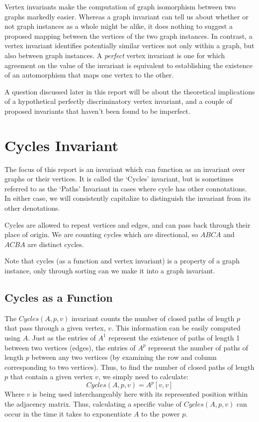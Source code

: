 \documentclass[11pt,a4paper]{report}
\begin{document}
Vertex invariants make the computation of graph isomorphism between two graphs markedly easier. 
Whereas a graph invariant can tell us about whether or not graph instances as a whole might be alike, it does nothing to suggest a proposed mapping between the vertices of the two graph instances.
In contrast, a vertex invariant identifies potentially similar vertices not only within a graph, but also between graph instances.
A \emph{perfect} vertex invariant is one for which agreement on the value of the invariant is equivalent to establishing the existence of an automorphism that maps one vertex to the other.

A question discussed later in this report will be about the theoretical implications of a hypothetical perfectly discriminatory vertex invariant, and a couple of proposed invariants that haven't been found to be imperfect.

\section{Cycles Invariant}
The focus of this report is an invariant which can function as an invariant over graphs or their vertices.
It is called the `Cycles' invariant, but is sometimes referred to as the `Paths' Invariant in cases where cycle has other connotations.
In either case, we will consistently capitalize to distinguish the invariant from its other denotations.

Cycles are allowed to repeat vertices and edges, and can pass back through their place of origin.
We are counting cycles which are directional, so $ABCA$ and $ACBA$ are distinct cycles.

Note that cycles (as a function and vertex invariant) is a property of a graph instance, only through sorting can we make it into a graph invariant.

\subsection{Cycles as a Function}

The $Cycles(A, p, v)$ invariant counts the number of closed paths of length $p$ that pass through a given vertex, $v$. 
This information can be easily computed using $A$. 
Just as the entries of $A^1$ represent the existence of paths of length 1 between two vertices (edges), the entries of $A^p$ represent the number of paths of length $p$ between any two vertices (by examining the row and column corresponding to two vertices).
Thus, to find the number of closed paths of length $p$ that contain a given vertex $v$, we simply need to calculate: 
$$Cycles(A, p, v) = A^p[v, v]$$
Where $v$ is being used interchangeably here with its represented position within the adjacency matrix. 
Thus, calculating a specific value of $Cycles(A, p, v)$ can occur in the time it takes to exponentiate $A$ to the power $p$.
\end{document}
